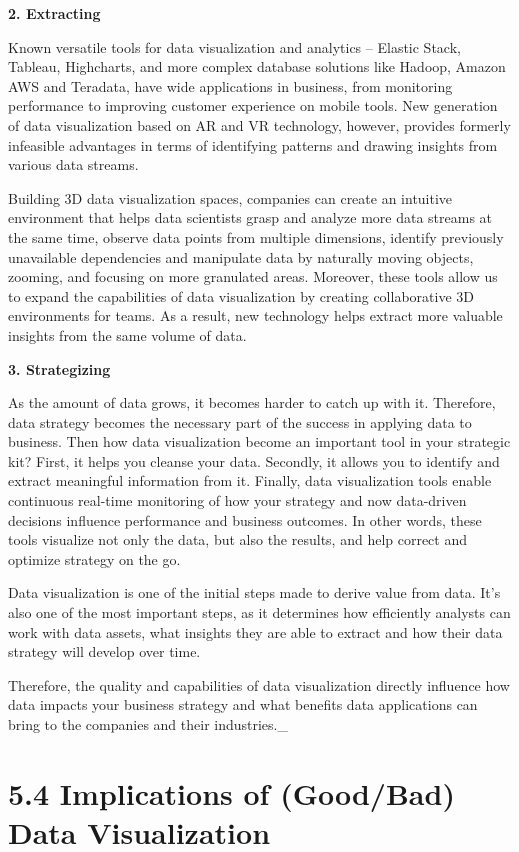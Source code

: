 \documentclass[]{book}
\theoremstyle{definition}
\theoremstyle{definition}
\theoremstyle{definition}
\theoremstyle{remark}
\begin{document}
\textbf{2. Extracting}

Known versatile tools for data visualization and analytics -- Elastic
Stack, Tableau, Highcharts, and more complex database solutions like
Hadoop, Amazon AWS and Teradata, have wide applications in business,
from monitoring performance to improving customer experience on mobile
tools. New generation of data visualization based on AR and VR
technology, however, provides formerly infeasible advantages in terms of
identifying patterns and drawing insights from various data streams.

Building 3D data visualization spaces, companies can create an intuitive
environment that helps data scientists grasp and analyze more data
streams at the same time, observe data points from multiple dimensions,
identify previously unavailable dependencies and manipulate data by
naturally moving objects, zooming, and focusing on more granulated
areas. Moreover, these tools allow us to expand the capabilities of data
visualization by creating collaborative 3D environments for teams. As a
result, new technology helps extract more valuable insights from the
same volume of data.

\textbf{3. Strategizing}

As the amount of data grows, it becomes harder to catch up with it.
Therefore, data strategy becomes the necessary part of the success in
applying data to business. Then how data visualization become an
important tool in your strategic kit? First, it helps you cleanse your
data. Secondly, it allows you to identify and extract meaningful
information from it. Finally, data visualization tools enable continuous
real-time monitoring of how your strategy and now data-driven decisions
influence performance and business outcomes. In other words, these tools
visualize not only the data, but also the results, and help correct and
optimize strategy on the go.

Data visualization is one of the initial steps made to derive value from
data. It's also one of the most important steps, as it determines how
efficiently analysts can work with data assets, what insights they are
able to extract and how their data strategy will develop over time.

Therefore, the quality and capabilities of data visualization directly
influence how data impacts your business strategy and what benefits data
applications can bring to the companies and their industries.\_

\section{5.4 Implications of (Good/Bad) Data
Visualization}\label{implications-of-goodbad-data-visualization}
\end{document}
